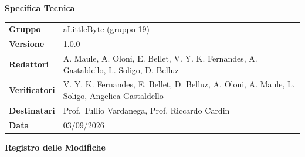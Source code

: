 \documentclass[a4paper,12pt]{article}
\begin{document}
\hypersetup{pageanchor=false}

\thispagestyle{firstpage}

\vspace*{0.5cm}

\begin{center}
    {\LARGE \textbf{Specifica Tecnica}}
\end{center}

\vspace{1.5cm}

\begin{center}
    \renewcommand{\arraystretch}{1.3}
    \begin{tcolorbox}[
        width=0.92\textwidth,
        colback=gray!6,
        colframe=gray!45,
        boxrule=0.5pt,
        arc=2mm,
        boxsep=0pt,
        left=8pt, right=8pt, top=8pt, bottom=8pt
    ]
        \begin{tabularx}{\linewidth}{>{\bfseries}p{3.5cm} X}
            Gruppo      & aLittleByte (gruppo 19) \\
            Versione    & 1.0.0 \\
            Redattori   & A. Maule, A. Oloni, E. Bellet, V. Y. K. Fernandes, A. Gastaldello, L. Soligo, D. Belluz \\
            Verificatori&  V. Y. K. Fernandes, E. Bellet, D. Belluz, A. Oloni, A. Maule, L. Soligo, Angelica Gastaldello\\
            Destinatari & Prof. Tullio Vardanega, Prof. Riccardo Cardin \\
            Data        & 03/09/2026 \\
        \end{tabularx}
    \end{tcolorbox}
\end{center}

\newpage


\begin{center}
    {\Large \textbf{Registro delle Modifiche}}
\end{center}

\vspace{0.35cm}
\end{document}
